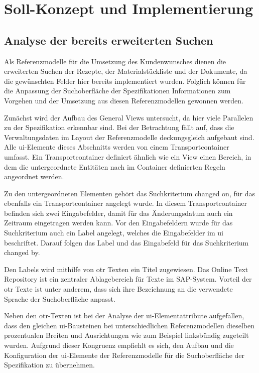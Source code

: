 \chapter{Soll-Konzept und Implementierung}

\section {Analyse der bereits erweiterten Suchen}

Als Referenzmodelle für die Umsetzung des Kundenwunsches dienen die erweiterten Suchen der Rezepte, der Materialstückliste und der Dokumente, da die gewünschten Felder hier bereits implementiert wurden. Folglich können für die Anpassung der Suchoberfläche der Spezifikationen Informationen zum Vorgehen und der Umsetzung aus diesen Referenzmodellen gewonnen werden.

Zunächst wird der Aufbau des General Views untersucht, da hier viele Parallelen zu der Spezifikation erkennbar sind.
Bei der Betrachtung fällt auf, dass die Verwaltungsdaten im Layout der Referenzmodelle deckungsgleich aufgebaut sind. Alle \ac{ui}-Elemente dieses Abschnitts werden von einem Transportcontainer umfasst. Ein Transportcontainer definiert ähnlich wie ein View einen Bereich, in dem die untergeordnete Entitäten nach im Container definierten Regeln angeordnet werden.

Zu den untergeordneten Elementen gehört das Suchkriterium changed on, für das ebenfalls ein Transportcontainer angelegt wurde. In diesem Transportcontainer befinden sich zwei Eingabefelder, damit für das Änderungsdatum auch ein Zeitraum eingetragen werden kann. Vor den Eingabefeldern wurde für das Suchkriterium auch ein Label angelegt, welches die Eingabefelder im \ac{ui} beschriftet. Darauf folgen das Label und das Eingabefeld für das Suchkriterium changed by.

Den Labels wird mithilfe von \acs{otr} Texten ein Titel zugewiesen. Das Online Text Repository ist ein zentraler Ablagebereich für Texte im SAP-System. Vorteil der \acs{otr} Texte ist unter anderem, dass sich ihre Bezeichnung an die verwendete Sprache der Suchoberfläche anpasst.  

Neben den \acs{otr}-Texten ist bei der Analyse der \ac{ui}-Elementattribute aufgefallen, dass den gleichen  \ac{ui}-Bausteinen bei unterschiedlichen Referenzmodellen dieselben prozentualen Breiten und Ausrichtungen wie zum Beispiel linksbündig zugeteilt wurden. Aufgrund dieser Kongruenz empfiehlt es sich, den Aufbau und die Konfiguration der \ac{ui}-Elemente der Referenzmodelle für die Suchoberfläche der Spezifikation zu übernehmen. 

